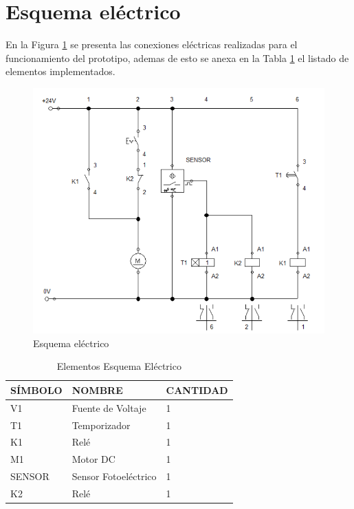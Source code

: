 \newpage
	\section{Esquema eléctrico}
		En la Figura \ref{fig:Esquema} se presenta las conexiones eléctricas realizadas para el funcionamiento del prototipo, ademas de esto se anexa en la Tabla \ref{table:esquema} el listado de elementos implementados.  
		\begin{figure}[ht]
			\centering
			\includegraphics[scale=0.5]{Figs/66.png}
			\caption{Esquema eléctrico}
			\label{fig:Esquema}
		\end{figure}
	
		\begin{table}[ht]
		\centering
		\begin{tabular}{|p{2cm}|p{5cm}||p{3cm}|}
			\hline
			SÍMBOLO & NOMBRE & CANTIDAD \\ 
			\hline
			 V1 & Fuente de Voltaje & 1 \\
			\hline
			 T1 & Temporizador & 1 \\
			\hline
			 K1 & Relé & 1 \\
			\hline
			 M1 & Motor DC & 1 \\
			\hline
			 SENSOR & Sensor Fotoeléctrico & 1 \\
			\hline
			 K2 & Relé & 1 \\
			\hline
		\end{tabular}	
		\caption{Elementos Esquema Eléctrico}
		\label{table:esquema}
		\end{table}	
		
